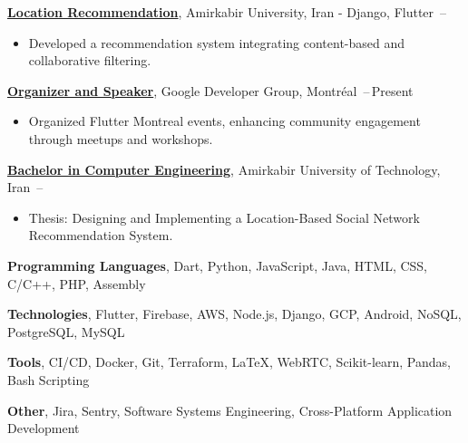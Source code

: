 \documentclass[letterpaper,11pt]{article}
\begin{document}
\BigGap
\href{https://raw.githubusercontent.com/aliyazdi75/Resume/main/BScThesis-Abstract.pdf?token=GHSAT0AAAAAACNTPCQKF3DMPOJ3YIMG3IPUZO5MTGQ}
{\textbf{Location Recommendation}}, Amirkabir University, Iran - Django, Flutter
\hfill {}\,--\,
\begin{itemize}[leftmargin=*, noitemsep, topsep=0pt, partopsep=0pt]
    \item Developed a recommendation system integrating content-based and collaborative filtering.
\end{itemize}



\href{https://gdg.community.dev/gdg-montreal}
{\textbf{Organizer and Speaker}}, Google Developer Group, Montréal
\hfill {}\,--\,Present
\begin{itemize}[leftmargin=*, noitemsep, topsep=0pt, partopsep=0pt]
    \item Organized Flutter Montreal events, enhancing community engagement through meetups and workshops.
\end{itemize}



\href{https://aut.ac.ir/en}
{\textbf{Bachelor in Computer Engineering}}, Amirkabir University of Technology, Iran
\hfill {}\,--\,
\begin{itemize}[leftmargin=*, noitemsep, topsep=0pt, partopsep=0pt]
    \item Thesis: Designing and Implementing a Location-Based Social Network Recommendation System.
\end{itemize}



\textbf{Programming Languages}, Dart, Python, JavaScript, Java, HTML, CSS, C/C++, PHP, Assembly

\Gap
\textbf{Technologies}, Flutter, Firebase, AWS, Node.js, Django, GCP, Android, NoSQL, PostgreSQL, MySQL

\Gap
\textbf{Tools}, CI/CD, Docker, Git, Terraform, \LaTeX, WebRTC, Scikit-learn, Pandas, Bash Scripting

\Gap
\textbf{Other}, Jira, Sentry, Software Systems Engineering, Cross-Platform Application Development
\end{document}
